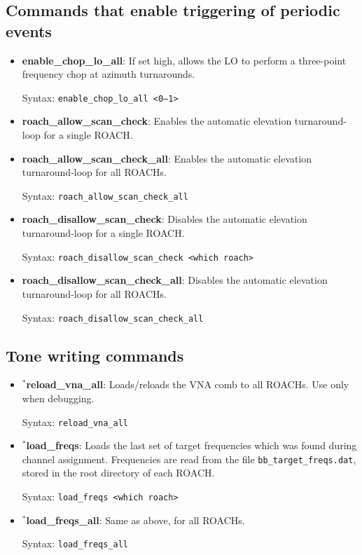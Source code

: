 \subsection{Commands that enable triggering of periodic events}

\begin{itemize}[leftmargin=*,label={}]

\item \textbf{enable\_chop\_lo\_all}: If set high, allows the LO to perform a three-point frequency chop at azimuth turnarounds.

Syntax: \texttt{enable\_chop\_lo\_all <0--1>}

\item \textbf{roach\_allow\_scan\_check}: Enables the automatic elevation turnaround-loop for a single ROACH\@.

\item \textbf{roach\_allow\_scan\_check\_all}: Enables the automatic elevation turnaround-loop for all ROACHs.

Syntax: \texttt{roach\_allow\_scan\_check\_all}

\item \textbf{roach\_disallow\_scan\_check}: Disables the automatic elevation turnaround-loop for a single ROACH\@.

Syntax: \texttt{roach\_disallow\_scan\_check <which roach>}

\item \textbf{roach\_disallow\_scan\_check\_all}: Disables the automatic elevation turnaround-loop for all ROACHs.

Syntax: \texttt{roach\_disallow\_scan\_check\_all}

\end{itemize}

\subsection{Tone writing commands}
\begin{itemize}[leftmargin=*,label={}]

\item $^{*}$\textbf{reload\_vna\_all}: Loads/reloads the VNA comb to all ROACHs. Use only when debugging.

Syntax: \texttt{reload\_vna\_all}

\item $^{*}$\textbf{load\_freqs}: Loads the last set of target frequencies which was found during channel assignment. Frequencies are read from the file \texttt{bb\_target\_freqs.dat}, stored in the root directory of each ROACH\@.

Syntax: \texttt{load\_freqs <which roach>}

\item $^{*}$\textbf{load\_freqs\_all}: Same as above, for all ROACHs.

Syntax: \texttt{load\_freqs\_all}

\end{itemize}

